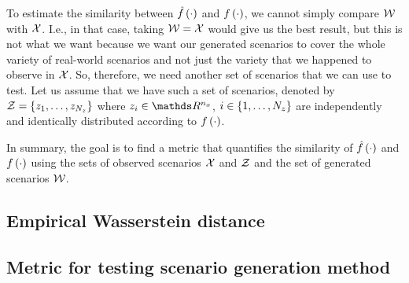 To estimate the similarity between $\hat{f}\left( \cdot \right)$ and $f\left( \cdot \right)$, we cannot simply compare $\mathcal{W}$ with $\mathcal{X}$.
I.e., in that case, taking $\mathcal{W}=\mathcal{X}$ would give us the best result, but this is not what we want because we want our generated scenarios to cover the whole variety of real-world scenarios and not just the variety that we happened to observe in $\mathcal{X}$.
So, therefore, we need another set of scenarios that we can use to test.
Let us assume that we have such a set of scenarios, denoted by $\mathcal{Z} = \{z_{1},\ldots,z_{N_z}\}$ where $\scenarioparstest_{\scenarioindex} \in \realnumbers^{\dimensionscenariopars}$, $i \in \{1, \ldots, N_z\}$ are independently and identically distributed according to $f\left( \cdot \right)$.

In summary, the goal is to find a metric that quantifies the similarity of $\hat{f}\left( \cdot \right)$ and $f\left( \cdot \right)$ using the sets of observed scenarios $\mathcal{X}$ and $\mathcal{Z}$ and the set of generated scenarios $\mathcal{W}$.



\subsection{Empirical Wasserstein distance}
\label{sec:wasserstein}



\subsection{Metric for testing scenario generation method}
\label{sec:metric scenario generation method}

